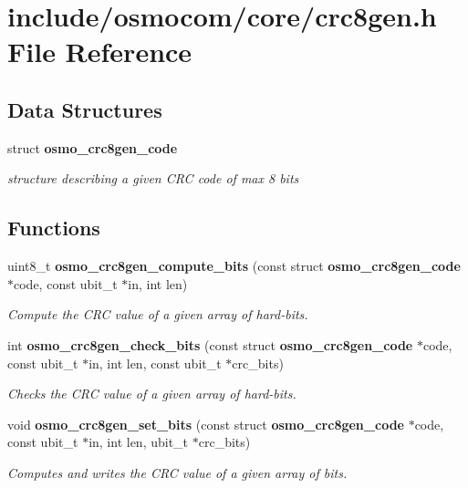 \section{include/osmocom/core/crc8gen.h File Reference}
\label{crc8gen_8h}
\subsection*{Data Structures}
\begin{DoxyCompactItemize}
\item 
struct {\bf osmo\-\_\-crc8gen\-\_\-code}
\begin{DoxyCompactList}\small\item\em structure describing a given C\-R\-C code of max 8 bits \end{DoxyCompactList}\end{DoxyCompactItemize}
\subsection*{Functions}
\begin{DoxyCompactItemize}
\item 
uint8\-\_\-t {\bf osmo\-\_\-crc8gen\-\_\-compute\-\_\-bits} (const struct {\bf osmo\-\_\-crc8gen\-\_\-code} $\ast$code, const ubit\-\_\-t $\ast$in, int len)
\begin{DoxyCompactList}\small\item\em Compute the C\-R\-C value of a given array of hard-\/bits. \end{DoxyCompactList}\item 
int {\bf osmo\-\_\-crc8gen\-\_\-check\-\_\-bits} (const struct {\bf osmo\-\_\-crc8gen\-\_\-code} $\ast$code, const ubit\-\_\-t $\ast$in, int len, const ubit\-\_\-t $\ast$crc\-\_\-bits)
\begin{DoxyCompactList}\small\item\em Checks the C\-R\-C value of a given array of hard-\/bits. \end{DoxyCompactList}\item 
void {\bf osmo\-\_\-crc8gen\-\_\-set\-\_\-bits} (const struct {\bf osmo\-\_\-crc8gen\-\_\-code} $\ast$code, const ubit\-\_\-t $\ast$in, int len, ubit\-\_\-t $\ast$crc\-\_\-bits)
\begin{DoxyCompactList}\small\item\em Computes and writes the C\-R\-C value of a given array of bits. \end{DoxyCompactList}\end{DoxyCompactItemize}

